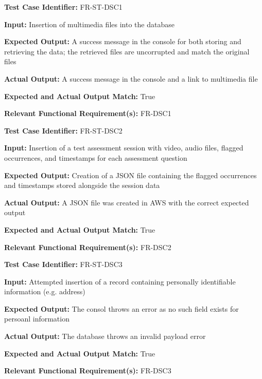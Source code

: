 \documentclass[12pt, titlepage]{article}
\begin{document}
\begin{mdframed}[linewidth=0.5mm] \par
  \textbf{Test Case Identifier:} FR-ST-DSC1 \par
  \textbf{Input:} Insertion of multimedia files into the database \par
  \textbf{Expected Output:} A success message in the console for both storing and retrieving the data; the retrieved files are uncorrupted and match the original files \par
  \textbf{Actual Output:} A success message in the console and a link to multimedia file \par
  \textbf{Expected and Actual Output Match:} True \par
  \textbf{Relevant Functional Requirement(s):} FR-DSC1
\end{mdframed}

\begin{mdframed}[linewidth=0.5mm] \par
  \textbf{Test Case Identifier:} FR-ST-DSC2 \par
  \textbf{Input:} Insertion of a test assessment session with video, audio files, flagged occurrences, and timestamps for each assessment question \par
  \textbf{Expected Output:} Creation of a JSON file containing the flagged occurrences and timestamps stored alongside the session data \par
  \textbf{Actual Output:} A JSON file was created in AWS with the correct expected output \par
  \textbf{Expected and Actual Output Match:} True \par
  \textbf{Relevant Functional Requirement(s):} FR-DSC2
\end{mdframed}

\begin{mdframed}[linewidth=0.5mm] \par
  \textbf{Test Case Identifier:} FR-ST-DSC3 \par
  \textbf{Input:} Attempted insertion of a record containing personally identifiable information (e.g. address) \par
  \textbf{Expected Output:} The consol throws an error as no such field exists for persoanl information \par
  \textbf{Actual Output:} The database throws an invalid payload error\par
  \textbf{Expected and Actual Output Match:} True \par
  \textbf{Relevant Functional Requirement(s):} FR-DSC3
\end{mdframed}
\end{document}
